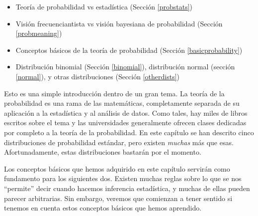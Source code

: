 \documentclass[spanish,]{book}
\providecommand{\tightlist}{%
  \setlength{\itemsep}{0pt}\setlength{\parskip}{0pt}}
\begin{document}
\begin{itemize}
\tightlist
\item
  Teoría de probabilidad vs estadística (Sección \ref{probstats})
\item
  Visión frecuenciantista vs visión bayesiana de probabilidad (Sección
  \ref{probmeaning})
\item
  Conceptos básicos de la teoría de probabilidad (Sección
  \ref{basicprobability})
\item
  Distribución binomial (Sección \ref{binomial}), distribución normal
  (sección \ref{normal}), y otras distribuciones (Sección
  \ref{otherdists})
\end{itemize}

Esto es una simple introducción dentro de un gran tema. La teoría de la
probabilidad es una rama de las matemáticas, completamente separada de
su aplicación a la estadística y al análisis de datos. Como tales, hay
miles de libros escritos sobre el tema y las universidades generalmente
ofrecen clases dedicadas por completo a la teoría de la probabilidad. En
este capítulo se han descrito cinco distribuciones de probabilidad
estándar, pero existen \emph{muchas} más que esas. Afortunadamente,
estas distribuciones bastarán por el momento.

Los conceptos básicos que hemos adquirido en este capítulo servirán como
fundamento para los siguientes dos. Existen muchas reglas sobre lo que
se nos ``permite'' decir cuando hacemos inferencia estadística, y muchas
de ellas pueden parecer arbitrarias. Sin embargo, veremos que comienzan
a tener sentido si tenemos en cuenta estos conceptos básicos que hemos
aprendido.


\end{document}
